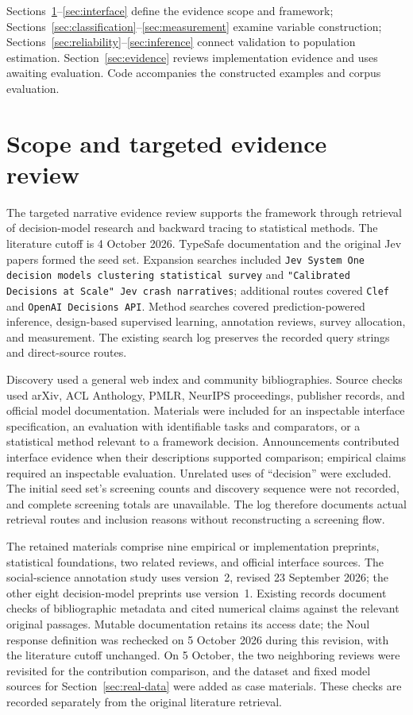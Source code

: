 \documentclass[11pt,a4paper]{article}
\begin{document}
Sections~\ref{sec:scope}--\ref{sec:interface} define the evidence scope and framework; Sections~\ref{sec:classification}--\ref{sec:measurement} examine variable construction; Sections~\ref{sec:reliability}--\ref{sec:inference} connect validation to population estimation. Section~\ref{sec:evidence} reviews implementation evidence and uses awaiting evaluation. Code accompanies the constructed examples and corpus evaluation.

\section{Scope and targeted evidence review}\label{sec:scope}

The targeted narrative evidence review supports the framework through retrieval of decision-model research and backward tracing to statistical methods. The literature cutoff is 4 October 2026. TypeSafe documentation and the original Jev papers formed the seed set. Expansion searches included \texttt{Jev System One decision models clustering statistical survey} and \texttt{"Calibrated Decisions at Scale" Jev crash narratives}; additional routes covered \texttt{Clef} and \texttt{OpenAI Decisions API}. Method searches covered prediction-powered inference, design-based supervised learning, annotation reviews, survey allocation, and measurement. The existing search log preserves the recorded query strings and direct-source routes.

Discovery used a general web index and community bibliographies. Source checks used arXiv, ACL Anthology, PMLR, NeurIPS proceedings, publisher records, and official model documentation. Materials were included for an inspectable interface specification, an evaluation with identifiable tasks and comparators, or a statistical method relevant to a framework decision. Announcements contributed interface evidence when their descriptions supported comparison; empirical claims required an inspectable evaluation. Unrelated uses of ``decision'' were excluded. The initial seed set's screening counts and discovery sequence were not recorded, and complete screening totals are unavailable. The log therefore documents actual retrieval routes and inclusion reasons without reconstructing a screening flow.

The retained materials comprise nine empirical or implementation preprints, statistical foundations, two related reviews, and official interface sources. The social-science annotation study uses version~2, revised 23 September 2026; the other eight decision-model preprints use version~1. Existing records document checks of bibliographic metadata and cited numerical claims against the relevant original passages. Mutable documentation retains its access date; the Noul response definition was rechecked on 5 October 2026 during this revision, with the literature cutoff unchanged. On 5 October, the two neighboring reviews were revisited for the contribution comparison, and the dataset and fixed model sources for Section~\ref{sec:real-data} were added as case materials. These checks are recorded separately from the original literature retrieval.
\end{document}
